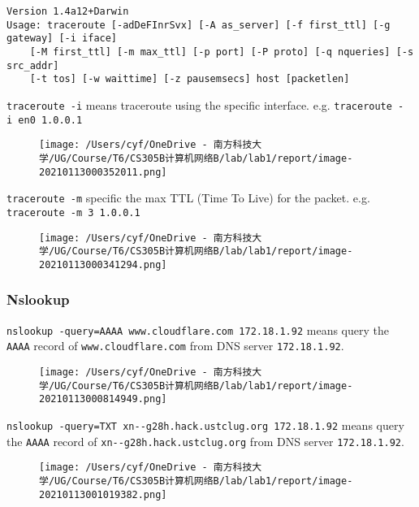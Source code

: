 \documentclass[
]{article}
\begin{document}
\begin{verbatim}
Version 1.4a12+Darwin
Usage: traceroute [-adDeFInrSvx] [-A as_server] [-f first_ttl] [-g gateway] [-i iface]
	[-M first_ttl] [-m max_ttl] [-p port] [-P proto] [-q nqueries] [-s src_addr]
	[-t tos] [-w waittime] [-z pausemsecs] host [packetlen]
\end{verbatim}

\texttt{traceroute\ -i} means traceroute using the specific interface.
e.g. \texttt{traceroute\ -i\ en0\ 1.0.0.1}

\begin{figure}
\centering
\texttt{[image: /Users/cyf/OneDrive - 南方科技大学/UG/Course/T6/CS305B计算机网络B/lab/lab1/report/image-20210113000352011.png]}
\caption{}
\end{figure}

\texttt{traceroute\ -m} specific the max TTL (Time To Live) for the
packet. e.g. \texttt{traceroute\ -m\ 3\ 1.0.0.1}

\begin{figure}
\centering
\texttt{[image: /Users/cyf/OneDrive - 南方科技大学/UG/Course/T6/CS305B计算机网络B/lab/lab1/report/image-20210113000341294.png]}
\caption{}
\end{figure}

\hypertarget{header-n60}{%
\subsubsection{Nslookup}\label{header-n60}}

\texttt{nslookup\ -query=AAAA\ www.cloudflare.com\ 172.18.1.92} means
query the \texttt{AAAA} record of \texttt{www.cloudflare.com} from DNS
server \texttt{172.18.1.92}.

\begin{figure}
\centering
\texttt{[image: /Users/cyf/OneDrive - 南方科技大学/UG/Course/T6/CS305B计算机网络B/lab/lab1/report/image-20210113000814949.png]}
\caption{}
\end{figure}

\texttt{nslookup\ -query=TXT\ xn-\/-g28h.hack.ustclug.org\ 172.18.1.92}
means query the \texttt{AAAA} record of
\texttt{xn-\/-g28h.hack.ustclug.org} from DNS server
\texttt{172.18.1.92}.

\begin{figure}
\centering
\texttt{[image: /Users/cyf/OneDrive - 南方科技大学/UG/Course/T6/CS305B计算机网络B/lab/lab1/report/image-20210113001019382.png]}
\caption{}
\end{figure}
\end{document}

